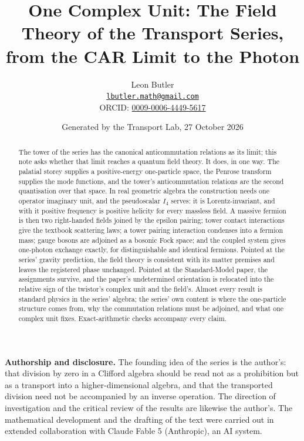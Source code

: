 \documentclass[11pt]{article}
\title{\bfseries One Complex Unit: The Field Theory of the Transport Series, from the CAR Limit to the Photon}
\author{Leon Butler\\ \normalsize\href{mailto:lbutler.math@gmail.com}{\texttt{lbutler.math@gmail.com}}\\ \normalsize ORCID: \href{https://orcid.org/0009-0006-4449-5617}{0009-0006-4449-5617}}
\date{Generated by the Transport Lab, 27 October 2026}
\theoremstyle{definition}
\theoremstyle{plain}
\begin{document}
\maketitle
\begin{abstract}
\normalsize
The tower of the series has the canonical anticommutation relations as its limit; this note asks whether that limit reaches a quantum field theory. It does, in one way. The palatial storey supplies a positive-energy one-particle space, the Penrose transform supplies the mode functions, and the tower's anticommutation relations are the second quantisation over that space. In real geometric algebra the construction needs one operator imaginary unit, and the pseudoscalar $I_4$ serves: it is Lorentz-invariant, and with it positive frequency is positive helicity for every massless field. A massive fermion is then two right-handed fields joined by the epsilon pairing; tower contact interactions give the textbook scattering laws; a tower pairing interaction condenses into a fermion mass; gauge bosons are adjoined as a bosonic Fock space; and the coupled system gives one-photon exchange exactly, for distinguishable and identical fermions. Pointed at the series' gravity prediction, the field theory is consistent with its matter premises and leaves the registered phase unchanged. Pointed at the Standard-Model paper, the assignments survive, and the paper's undetermined orientation is relocated into the relative sign of the twistor's complex unit and the field's. Almost every result is standard physics in the series' algebra; the series' own content is where the one-particle structure comes from, why the commutation relations must be adjoined, and what one complex unit fixes. Exact-arithmetic checks accompany every claim.
\end{abstract}
\newpage
\noindent \textbf{Authorship and disclosure. }The founding idea of the series is the author's: that division by zero in a Clifford algebra should be read not as a prohibition but as a transport into a higher-dimensional algebra, and that the transported division need not be accompanied by an inverse operation. The direction of investigation and the critical review of the results are likewise the author's. The mathematical development and the drafting of the text were carried out in extended collaboration with Claude Fable 5 (Anthropic), an AI system.

\noindent{}
\newpage
\end{document}
